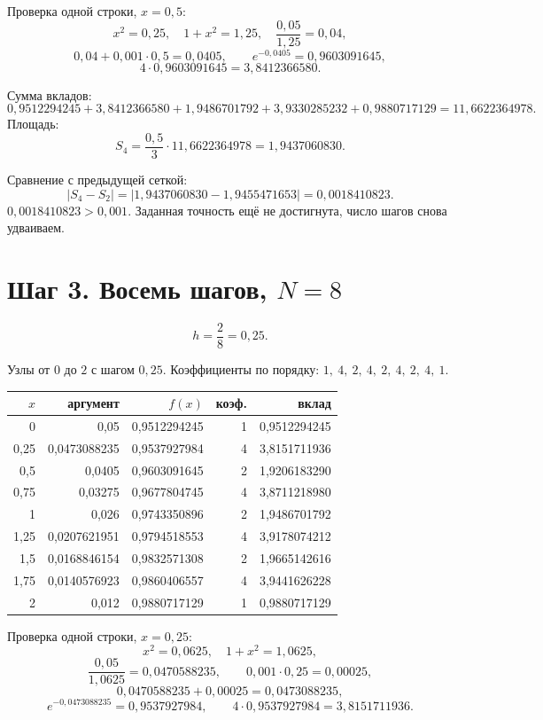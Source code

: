 \documentclass[11pt,a4paper]{article}
\begin{document}
Проверка одной строки, \(x = 0{,}5\):
\[
x^{2} = 0{,}25,\quad 1 + x^{2} = 1{,}25,\quad \frac{0{,}05}{1{,}25} = 0{,}04,
\]
\[
0{,}04 + 0{,}001\cdot 0{,}5 = 0{,}0405,
\qquad
e^{-0{,}0405} = 0{,}9603091645,
\]
\[
4\cdot 0{,}9603091645 = 3{,}8412366580.
\]

Сумма вкладов:
\[
0{,}9512294245 + 3{,}8412366580 + 1{,}9486701792 + 3{,}9330285232 + 0{,}9880717129
= 11{,}6622364978.
\]
Площадь:
\[
S_{4} = \frac{0{,}5}{3}\cdot 11{,}6622364978 = 1{,}9437060830.
\]

Сравнение с предыдущей сеткой:
\[
|S_{4} - S_{2}| = |1{,}9437060830 - 1{,}9455471653| = 0{,}0018410823.
\]
\(0{,}0018410823 > 0{,}001\). Заданная точность ещё не достигнута, число шагов снова удваиваем.

\section*{Шаг 3. Восемь шагов, \(N = 8\)}

\[
h = \frac{2}{8} = 0{,}25.
\]

Узлы от \(0\) до \(2\) с шагом \(0{,}25\). Коэффициенты по порядку:
\(1,\ 4,\ 2,\ 4,\ 2,\ 4,\ 2,\ 4,\ 1\).

{\small
\begin{center}
\begin{tabular}{@{}r r r r r@{}}
\toprule
\(x\) & аргумент & \(f(x)\) & коэф. & вклад \\
\midrule
0     & 0,05         & 0,9512294245 & 1 & 0,9512294245 \\
0,25  & 0,0473088235 & 0,9537927984 & 4 & 3,8151711936 \\
0,5   & 0,0405       & 0,9603091645 & 2 & 1,9206183290 \\
0,75  & 0,03275      & 0,9677804745 & 4 & 3,8711218980 \\
1     & 0,026        & 0,9743350896 & 2 & 1,9486701792 \\
1,25  & 0,0207621951 & 0,9794518553 & 4 & 3,9178074212 \\
1,5   & 0,0168846154 & 0,9832571308 & 2 & 1,9665142616 \\
1,75  & 0,0140576923 & 0,9860406557 & 4 & 3,9441626228 \\
2     & 0,012        & 0,9880717129 & 1 & 0,9880717129 \\
\bottomrule
\end{tabular}
\end{center}
}

Проверка одной строки, \(x = 0{,}25\):
\[
x^{2} = 0{,}0625,\quad 1 + x^{2} = 1{,}0625,
\]
\[
\frac{0{,}05}{1{,}0625} = 0{,}0470588235,
\qquad
0{,}001\cdot 0{,}25 = 0{,}00025,
\]
\[
0{,}0470588235 + 0{,}00025 = 0{,}0473088235,
\]
\[
e^{-0{,}0473088235} = 0{,}9537927984,
\qquad
4\cdot 0{,}9537927984 = 3{,}8151711936.
\]
\end{document}
